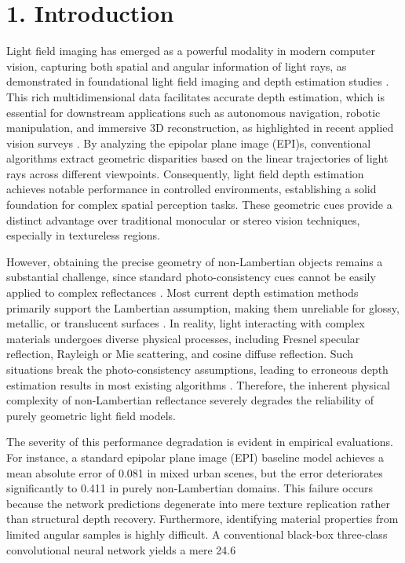 \section{1. Introduction}

Light field imaging has emerged as a powerful modality in modern computer vision, capturing both spatial and angular information of light rays, as demonstrated in foundational light field imaging and depth estimation studies . This rich multidimensional data facilitates accurate depth estimation, which is essential for downstream applications such as autonomous navigation, robotic manipulation, and immersive 3D reconstruction, as highlighted in recent applied vision surveys . By analyzing the epipolar plane image (EPI)s, conventional algorithms extract geometric disparities based on the linear trajectories of light rays across different viewpoints. Consequently, light field depth estimation achieves notable performance in controlled environments, establishing a solid foundation for complex spatial perception tasks. These geometric cues provide a distinct advantage over traditional monocular or stereo vision techniques, especially in textureless regions.

However, obtaining the precise geometry of non-Lambertian objects remains a substantial challenge, since standard photo-consistency cues cannot be easily applied to complex reflectances . Most current depth estimation methods primarily support the Lambertian assumption, making them unreliable for glossy, metallic, or translucent surfaces . In reality, light interacting with complex materials undergoes diverse physical processes, including Fresnel specular reflection, Rayleigh or Mie scattering, and cosine diffuse reflection. Such situations break the photo-consistency assumptions, leading to erroneous depth estimation results in most existing algorithms . Therefore, the inherent physical complexity of non-Lambertian reflectance severely degrades the reliability of purely geometric light field models.

The severity of this performance degradation is evident in empirical evaluations. For instance, a standard epipolar plane image (EPI) baseline model achieves a mean absolute error of 0.081 in mixed urban scenes, but the error deteriorates significantly to 0.411 in purely non-Lambertian domains. This failure occurs because the network predictions degenerate into mere texture replication rather than structural depth recovery. Furthermore, identifying material properties from limited angular samples is highly difficult. A conventional black-box three-class convolutional neural network yields a mere 24.6\\%

